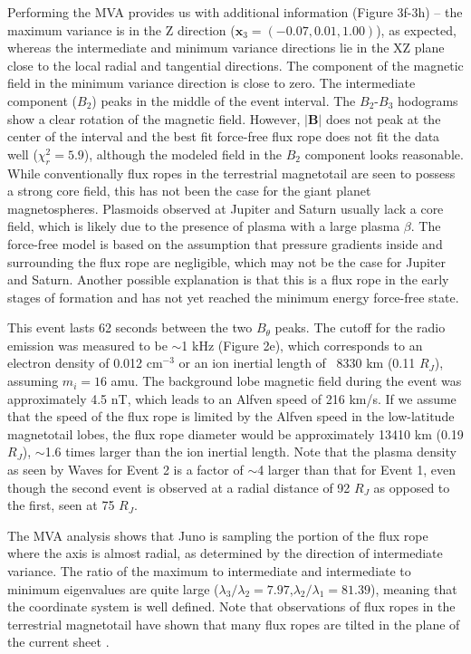 Performing the MVA provides us with additional information (Figure 3f-3h) – the maximum variance is in the Z direction ($\mathbf{x}_3=(-0.07,0.01,1.00)$), as expected, whereas the intermediate and minimum variance directions lie in the XZ plane close to the local radial and tangential directions. The component of the magnetic field in the minimum variance direction is close to zero. The intermediate component ($B_2$) peaks in the middle of the event interval. The $B_2$-$B_3$ hodograms show a clear rotation of the magnetic field. However, $|\mathbf{B}|$ does not peak at the center of the interval and the best fit force-free flux rope does not fit the data well ($\chi^2_r=5.9$), although the modeled field in the $B_2$ component looks reasonable. While conventionally flux ropes in the terrestrial magnetotail are seen to possess a strong core field, this has not been the case for the giant planet magnetospheres. Plasmoids observed at Jupiter and Saturn usually lack a core field, which is likely due to the presence of plasma with a large plasma $\beta$. The force-free model is based on the assumption that pressure gradients inside and surrounding the flux rope are negligible, which may not be the case for Jupiter and Saturn. Another possible explanation is that this is a flux rope in the early stages of formation and has not yet reached the minimum energy force-free state. 

This event lasts 62 seconds between the two $B_\theta$ peaks. The cutoff for the radio emission was measured to be $\sim$1 kHz (Figure 2e), which corresponds to an electron density of 0.012 cm$^{-3}$ or an ion inertial length of ~8330 km (0.11 $R_J$), assuming $m_i=16$ amu. The background lobe magnetic field during the event was approximately 4.5 nT, which leads to an Alfven speed of 216 km/s. If we assume that the speed of the flux rope is limited by the Alfven speed in the low-latitude magnetotail lobes, the flux rope diameter would be approximately 13410 km (0.19 $R_J$), $\sim$1.6 times larger than the ion inertial length. Note that the plasma density as seen by Waves for Event 2 is a factor of $\sim$4 larger than that for Event 1, even though the second event is observed at a radial distance of 92 $R_J$ as opposed to the first, seen at 75 $R_J$.

The MVA analysis shows that Juno is sampling the portion of the flux rope where the axis is almost radial, as determined by the direction of intermediate variance. The ratio of the maximum to intermediate and intermediate to minimum eigenvalues are quite large ($\lambda_3/\lambda_2=7.97$,$\lambda_2/\lambda_1=81.39$), meaning that the coordinate system is well defined. Note that observations of flux ropes in the terrestrial magnetotail have shown that many flux ropes are tilted in the plane of the current sheet \cite{Slavin2003GeotailSheet}.

